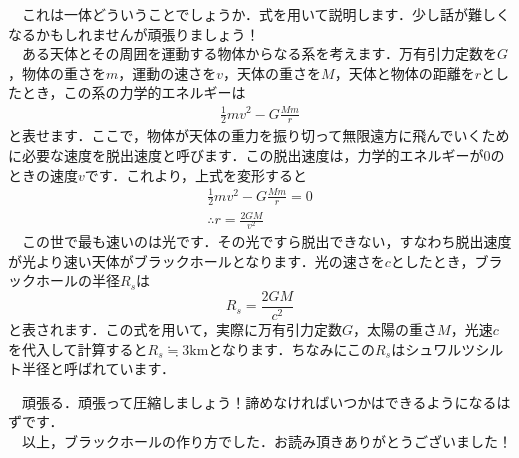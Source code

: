 \documentclass[dvipdfmx,a4paper,10pt]{jarticle}
\def\rm#1{\mathrm{#1}}
\begin{document}
\begin{tcolorbox}[enhanced,empty,left skip=0pt,left=5pt,
coltitle=white,title={\bf どういうこと？},sharp corners,
overlay={
\begin{tcbclipframe}
\fill[black] (title.south west)--++(3,0)--++(0,1)--++(-3,0)--cycle;
\end{tcbclipframe}}]
　これは一体どういうことでしょうか．式を用いて説明します．少し話が難しくなるかもしれませんが頑張りましょう！\\
　ある天体とその周囲を運動する物体からなる系を考えます．万有引力定数を$G$，物体の重さを$m$，運動の速さを$v$，天体の重さを$M$，天体と物体の距離を$r$としたとき，この系の力学的エネルギーは
\begin{gather*}
   \frac{1}{2}mv^2 - G\frac{Mm}{r}
\end{gather*}
と表せます．ここで，物体が天体の重力を振り切って無限遠方に飛んでいくために必要な速度を脱出速度と呼びます．この脱出速度は，力学的エネルギーが0のときの速度$v$です．これより，上式を変形すると
\begin{gather*}
   \frac{1}{2}mv^2 - G\frac{Mm}{r} = 0\\
   \therefore r = \frac{2GM}{v^2}
\end{gather*}
　この世で最も速いのは光です．その光ですら脱出できない，すなわち脱出速度が光より速い天体がブラックホールとなります．光の速さを$c$としたとき，ブラックホールの半径$R_s$は
\begin{equation}
   R_s = \frac{2GM}{c^2}
\nonumber
\end{equation}
と表されます．この式を用いて，実際に万有引力定数$G$，太陽の重さ$M$，光速$c$を代入して計算すると$R_s \fallingdotseq 3\rm{km}$となります．ちなみにこの$R_s$はシュワルツシルト半径と呼ばれています．

\begin{tcolorbox}[enhanced,empty,left skip=0pt,left=5pt,
coltitle=white,title={\bf どうやって圧縮するの？},sharp corners,
overlay={
\begin{tcbclipframe}
\fill[black] (title.south west)--++(4.3,0)--++(0,1)--++(-4.3,0)--cycle;
\end{tcbclipframe}}]
　頑張る．頑張って圧縮しましょう！諦めなければいつかはできるようになるはずです．\\
　以上，ブラックホールの作り方でした．お読み頂きありがとうございました！
\end{tcolorbox}

\end{tcolorbox}
\end{document}
